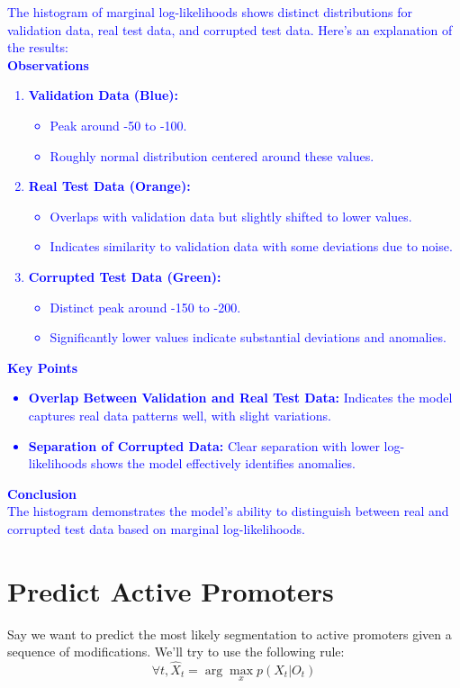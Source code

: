 \documentclass[a4 paper]{article}
\begin{document}
\textcolor{blue}{
    The histogram of marginal log-likelihoods shows distinct distributions for validation data, real test data, and corrupted test data. Here’s an explanation of the results: \\
    \textbf{Observations} \\
    \begin{enumerate}
        \item \textbf{Validation Data (Blue):}
        \begin{itemize}
            \item Peak around -50 to -100.
            \item Roughly normal distribution centered around these values.
        \end{itemize}
        \item \textbf{Real Test Data (Orange):}
        \begin{itemize}
            \item Overlaps with validation data but slightly shifted to lower values.
            \item Indicates similarity to validation data with some deviations due to noise.
        \end{itemize}
        \item \textbf{Corrupted Test Data (Green):}
        \begin{itemize}
            \item Distinct peak around -150 to -200.
            \item Significantly lower values indicate substantial deviations and anomalies.
        \end{itemize}
    \end{enumerate} 
    \textbf{Key Points} 
    \begin{itemize}
        \item \textbf{Overlap Between Validation and Real Test Data:} Indicates the model captures real data patterns well, with slight variations.
        \item \textbf{Separation of Corrupted Data:} Clear separation with lower log-likelihoods shows the model effectively identifies anomalies.
    \end{itemize} 
    \textbf{Conclusion} \\
    The histogram demonstrates the model's ability to distinguish between real and corrupted test data based on marginal log-likelihoods.
}




\section{Predict Active Promoters}
Say we want to predict the most likely segmentation to active promoters given a sequence of modifications. We’ll try to use the following rule:
\[
\forall t, \hat{X}_t = \arg \max_x p(X_t | O_t)
\]
\end{document}
